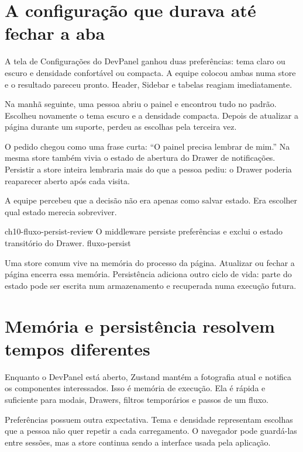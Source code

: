 \label{chap:persistencia}

\section{A configuração que durava até fechar a aba}

\begin{historia}
A tela de Configurações do DevPanel ganhou duas preferências: tema claro ou
escuro e densidade confortável ou compacta. A equipe colocou ambas numa store e
o resultado pareceu pronto. Header, Sidebar e tabelas reagiam imediatamente.

Na manhã seguinte, uma pessoa abriu o painel e encontrou tudo no padrão. Escolheu
novamente o tema escuro e a densidade compacta. Depois de atualizar a página
durante um suporte, perdeu as escolhas pela terceira vez.

O pedido chegou como uma frase curta: ``O painel precisa lembrar de mim.'' Na
mesma store também vivia o estado de abertura do Drawer de notificações.
Persistir a store inteira lembraria mais do que a pessoa pediu: o Drawer poderia
reaparecer aberto após cada visita.

A equipe percebeu que a decisão não era apenas como salvar estado. Era escolher
qual estado merecia sobreviver.
\end{historia}

\imagemcapitulo
  {ch10-fluxo-persist-review}
  {O middleware persiste preferências e exclui o estado transitório do Drawer.}
  {fluxo-persist}

Uma store comum vive na memória do processo da página. Atualizar ou fechar a
página encerra essa memória. Persistência adiciona outro ciclo de vida: parte do
estado pode ser escrita num armazenamento e recuperada numa execução futura.

\section{Memória e persistência resolvem tempos diferentes}

Enquanto o DevPanel está aberto, Zustand mantém a fotografia atual e notifica os
componentes interessados. Isso é memória de execução. Ela é rápida e suficiente
para modais, Drawers, filtros temporários e passos de um fluxo.

Preferências possuem outra expectativa. Tema e densidade representam escolhas
que a pessoa não quer repetir a cada carregamento. O navegador pode guardá-las
entre sessões, mas a store continua sendo a interface usada pela aplicação.

